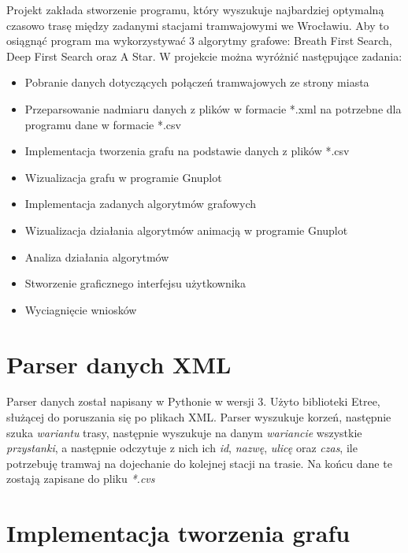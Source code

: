 \documentclass[13pt]{article}
\begin{document}
Projekt zakłada stworzenie programu, który wyszukuje najbardziej optymalną czasowo trasę między zadanymi stacjami tramwajowymi we Wrocławiu. Aby to osiągnąć program ma wykorzystywać 3 algorytmy grafowe: Breath First Search, Deep First Search oraz A Star. W projekcie można wyróżnić następujące zadania:
\begin{itemize}
\item Pobranie danych dotyczących połączeń tramwajowych ze strony miasta 
\item Przeparsowanie nadmiaru danych z plików w formacie *.xml na potrzebne dla programu dane w formacie *.csv
\item Implementacja tworzenia grafu na podstawie danych z plików *.csv
\item Wizualizacja grafu w programie Gnuplot
\item Implementacja zadanych algorytmów grafowych
\item Wizualizacja działania algorytmów animacją w programie Gnuplot
\item Analiza działania algorytmów 
\item Stworzenie graficznego interfejsu użytkownika
\item Wyciagnięcie wniosków
\end{itemize}

\section{Parser danych XML }

Parser danych został napisany w Pythonie w wersji 3.
Użyto biblioteki Etree, służącej do poruszania się po plikach XML.
Parser wyszukuje korzeń, następnie szuka \textit{wariantu} trasy, następnie wyszukuje na danym \textit{wariancie} wszystkie \textit{przystanki}, a następnie odczytuje z nich ich \textit{id},
\textit{nazwę}, \textit{ulicę} oraz \textit{czas}, ile potrzebuję tramwaj na dojechanie do kolejnej stacji na trasie.
Na końcu dane te zostają zapisane do pliku \textit{*.cvs}

\section{Implementacja tworzenia grafu} 
\end{document}
